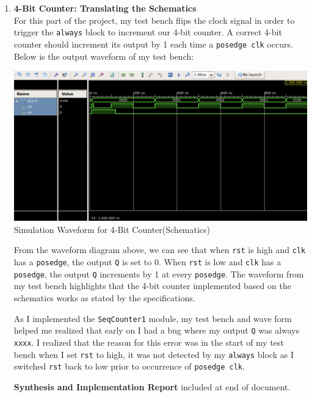 \documentclass{article}
\begin{document}
\begin{enumerate}
    \item \textbf{4-Bit Counter: Translating the Schematics} \\
    For this part of the project, my test bench flips the clock signal in order to trigger the \texttt{always} block to increment our 4-bit counter. A correct 4-bit counter should increment its output by 1 each time a \texttt{posedge clk} occurs. Below is the output waveform of my test bench: 
    \begin{center}
        \includegraphics[scale=0.5]{tb_comb1.png} \\
        \caption{Simulation Waveform for 4-Bit Counter(Schematics)}
    \end{center}
    From the waveform diagram above, we can see that when \texttt{rst} is high and \texttt{clk} has a \texttt{posedge}, the output \texttt{Q} is set to 0. When \texttt{rst} is low and \texttt{clk} has a \texttt{posedge}, the output \texttt{Q} increments by 1 at every \texttt{posedge}. The waveform from my test bench highlights that the 4-bit counter implemented based on the schematics works as stated by the specifications. \par
    As I implemented the \texttt{SeqCounter1} module, my test bench and wave form helped me realized that early on I had a bug where my output \texttt{Q} was always \texttt{xxxx}. I realized that the reason for this error was in the start of my test bench when I set \texttt{rst} to high, it was not detected by my \texttt{always} block as I switched \texttt{rst} back to low prior to occurrence of \texttt{posedge clk}. \par
    \textbf{Synthesis and Implementation Report} included at end of document.
    

\end{enumerate}
\end{document}
